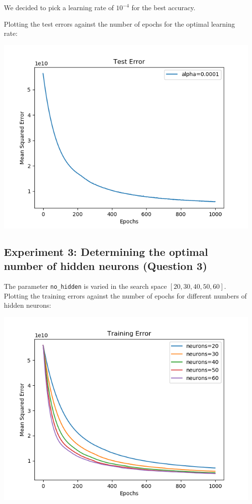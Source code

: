 We decided to pick a learning rate of \(10^{-4}\) for the best accuracy.

Plotting the test errors against the number of epochs for the optimal
learning rate:

\begin{center}
    \includegraphics[width=\imgw]{images/p1b2_alpha_test.png}   
\end{center}

\subsection*{Experiment 3: Determining the optimal number of hidden neurons
(Question 3)}

The parameter \texttt{no\_hidden} is varied in the search space
\([20,30,40,50,60]\).
Plotting the training errors against the number of epochs for different
numbers of hidden neurons:

\begin{center}
    \includegraphics[width=\imgw]{images/p1b3_neuron_train.png}   
\end{center}

